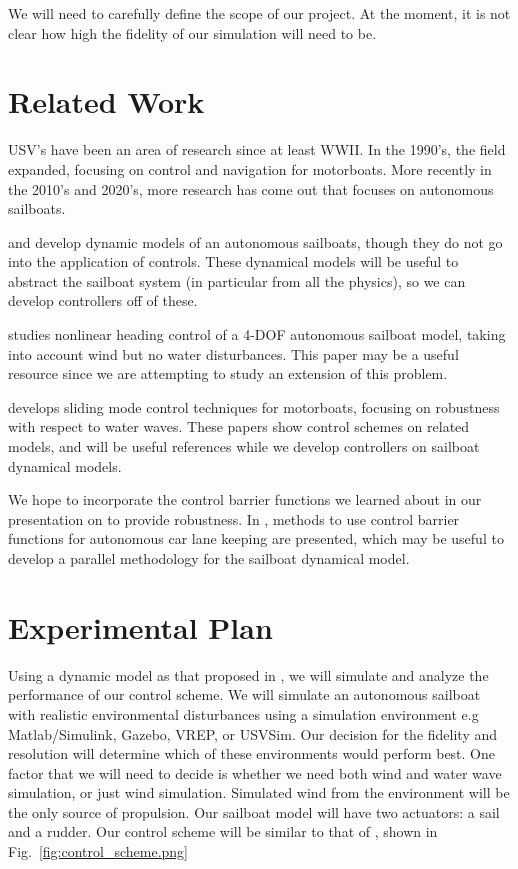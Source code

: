 \documentclass[conference]{IEEEtran}
\begin{document}
We will need to carefully define the scope of our project. At the moment, it is not clear how high the fidelity of our simulation will need to be.
\section{Related Work}
USV's have been an area of research since at least WWII. In the 1990's, the field expanded, focusing on control and navigation for motorboats. More recently in the 2010's and 2020's, more research has come out that focuses on autonomous sailboats.




\cite{Setiawan2020} and \cite{Buehler2018} develop dynamic models of an autonomous sailboats, though they do not go into the application of controls. These dynamical models will be useful to abstract the sailboat system (in particular from all the physics), so we can develop controllers off of these.

\cite{Xiao2014} studies nonlinear heading control of a 4-DOF autonomous sailboat model, taking into account wind but no water disturbances. This paper may be a useful resource since we are attempting to study an extension of this problem.

\cite{Velueta2019} develops sliding mode control techniques for motorboats, focusing on robustness with respect to water waves. These papers show control schemes on related models, and will be useful references while we develop controllers on sailboat dynamical models.

We hope to incorporate the control barrier functions we learned about in our presentation on \cite{Ames2019} to provide robustness. In \cite{Ames2017}, methods to use control barrier functions for autonomous car lane keeping are presented, which may be useful to develop a parallel methodology for the sailboat dynamical model.

\section{Experimental Plan}
Using a dynamic model as that proposed in \cite{Buehler2018}, we will simulate and analyze the performance of our control scheme. We will simulate an autonomous sailboat with realistic environmental disturbances using a simulation environment e.g Matlab/Simulink, Gazebo, VREP, or USVSim. Our decision for the fidelity and resolution will determine which of these environments would perform best. One factor that we will need to decide is whether we need both wind and water wave simulation, or just wind simulation. Simulated wind from the environment will be the only source of propulsion. Our sailboat model will have two actuators: a sail and a rudder. Our control scheme will be similar to that of \cite{HelmiAbrougui2019}, shown in Fig.~\ref{fig:control_scheme.png}
\end{document}
